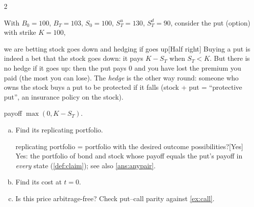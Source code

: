 \begin{paracol}{2}
\begin{exercise}\label{ex:put}
With $B_0=100$, $B_T=103$, $S_0=100$, $S_T^u=130$, $S_T^d=90$, consider the put (option) with strike $K=100$,\begin{answer}{we are betting stock goes down and hedging if goes up}[Half right]
Buying a put is indeed a bet that the stock goes down: it pays $K-S_T$ when $S_T<K$. But there is no
hedge if it goes up: then the put pays $0$ and you have lost the premium you paid (the most you can
lose). The \emph{hedge} is the other way round: someone who owns the stock buys a put to be protected if
it falls (stock + put = ``protective put'', an insurance policy on the stock).
\end{answer}
payoff $\max(0,K-S_T)$.
\begin{enumerate}[(a)]
  \item Find its replicating portfolio.\begin{answer}{replicating portfolio = portfolio with the desired outcome possibilities?}[Yes]
Yes: the portfolio of bond and stock whose payoff equals the put's payoff in \emph{every} state
(\cref{def:claim}); see also \cref{ans:anypair}.
\end{answer}
  \item Find its cost at $t=0$.
  \item Is this price
      arbitrage-free? Check put--call parity against \cref{ex:call}.
\end{enumerate}
\end{exercise}

\end{paracol}
